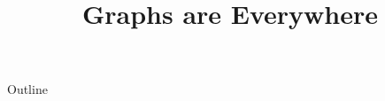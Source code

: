 \documentclass[xcolor=dvipsnames,compress,t,pdf,9pt]{beamer}
\title[\insertframenumber /\inserttotalframenumber]{Graphs are Everywhere}
\begin{document}
	\begin{frame}
	\titlepage
	\end{frame}
	
	\begin{frame}{Outline}
	    \tableofcontents
	\end{frame}

	
	
	
\end{document}

